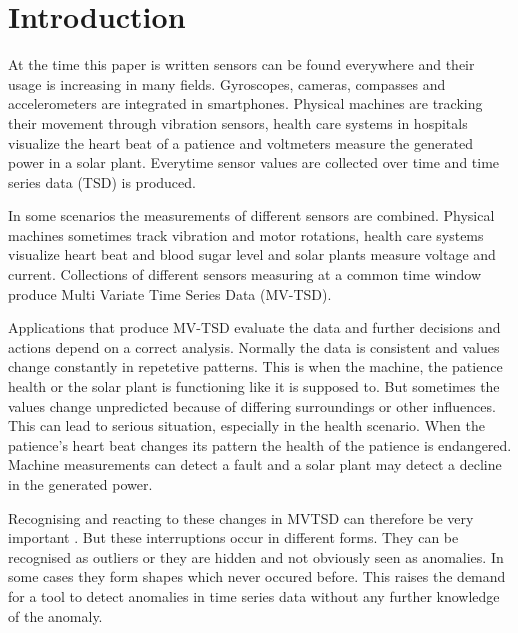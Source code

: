 \section{Introduction}\label{intro}
At the time this paper is written sensors can be found everywhere and their usage is increasing in many fields. Gyroscopes, cameras, compasses and accelerometers are integrated in smartphones. Physical machines are tracking their movement through vibration sensors, health care systems in hospitals visualize the heart beat of a patience and voltmeters measure the generated power in a solar plant. Everytime sensor values are collected over time and time series data (TSD) is produced.

In some scenarios the measurements of different sensors are combined. Physical machines sometimes track vibration and motor rotations, health care systems visualize heart beat and blood sugar level and solar plants measure voltage and current.
Collections of different sensors measuring at a common time window produce Multi Variate Time Series Data (MV-TSD).

Applications that produce MV-TSD evaluate the data and further decisions and actions depend on a correct analysis.
Normally the data is consistent and values change constantly in repetetive patterns. This is when the machine, the patience health or the solar plant is functioning like it is supposed to. But sometimes the values change unpredicted because of differing surroundings or other influences. This can lead to serious situation, especially in the health scenario. When the patience's heart beat changes its pattern the health of the patience is endangered. Machine measurements can detect a fault and a solar plant may detect a decline in the generated power.

Recognising and reacting to these changes in MVTSD can therefore be very important%
. But these interruptions occur in different forms. They can be recognised as outliers or they are hidden and not obviously seen as anomalies. In some cases they form shapes which never occured before. This raises the demand for a tool to detect anomalies in time series data without any further knowledge of the anomaly.

